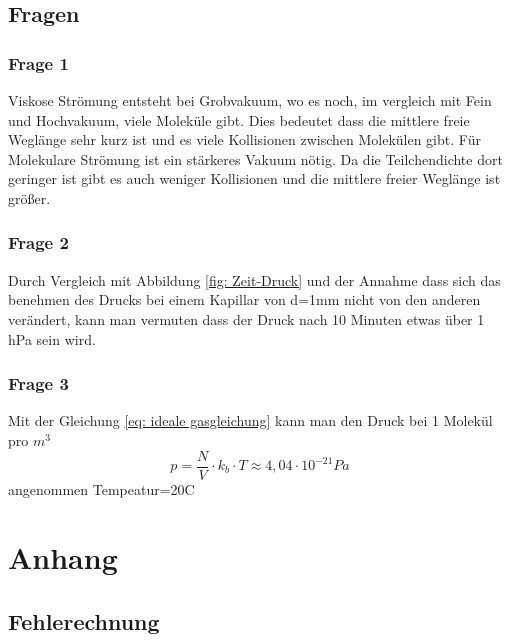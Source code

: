 \documentclass[12pt]{article}
\begin{document}
	
 	\subsection{Fragen}
 	\subsubsection{Frage 1}
 	Viskose Strömung entsteht bei Grobvakuum, wo es noch, im vergleich mit Fein und Hochvakuum, viele Moleküle gibt. Dies bedeutet dass die mittlere freie Weglänge sehr kurz ist und es viele Kollisionen zwischen Molekülen gibt. Für Molekulare Strömung ist ein stärkeres Vakuum nötig. Da die Teilchendichte dort geringer ist gibt es auch weniger Kollisionen und die mittlere freier Weglänge ist größer.
 	
 	\subsubsection{Frage 2}
 	Durch Vergleich mit Abbildung \ref{fig: Zeit-Druck} und der Annahme dass sich das benehmen des Drucks bei einem Kapillar von d=1mm nicht von den anderen verändert, kann man vermuten dass der Druck nach 10 Minuten etwas über 1 hPa sein wird.
 	\subsubsection{Frage 3}
 	Mit der Gleichung \ref{eq: ideale gasgleichung} kann man den Druck bei 1 Molekül pro $m^3$
 	\begin{equation}
		p=\frac{N}{V}\cdot k_b \cdot T \approx4,04 \cdot 10^{-21}Pa
 	\end{equation}
 	angenommen Tempeatur=20\textdegree C
	\section{Anhang}\label{sec:anh}
	\subsection{Fehlerechnung}
\end{document}
